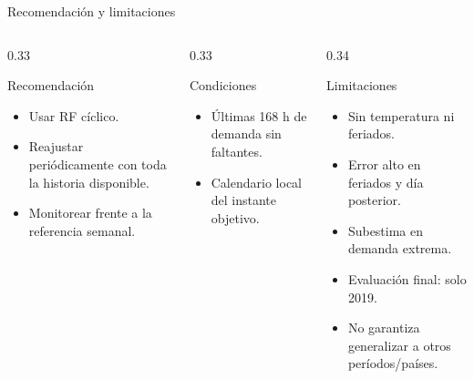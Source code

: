 \documentclass[11pt,aspectratio=169]{beamer}
\begin{document}
\begin{frame}{Recomendación y limitaciones}
  \begin{columns}[T]
    \begin{column}{0.33\textwidth}
      \begin{block}{Recomendación}
        \begin{itemize}
          \item Usar RF cíclico.
          \item Reajustar periódicamente con toda la historia disponible.
          \item Monitorear frente a la referencia semanal.
        \end{itemize}
      \end{block}
    \end{column}
    \begin{column}{0.33\textwidth}
      \begin{block}{Condiciones}
        \begin{itemize}
          \item Últimas 168 h de demanda sin faltantes.
          \item Calendario local del instante objetivo.
        \end{itemize}
      \end{block}
    \end{column}
    \begin{column}{0.34\textwidth}
      \begin{block}{Limitaciones}
        \begin{itemize}
          \item Sin temperatura ni feriados.
          \item Error alto en feriados y día posterior.
          \item Subestima en demanda extrema.
          \item Evaluación final: solo 2019.
          \item No garantiza generalizar a otros períodos/países.
        \end{itemize}
      \end{block}
    \end{column}
  \end{columns}
\end{frame}
\end{document}
